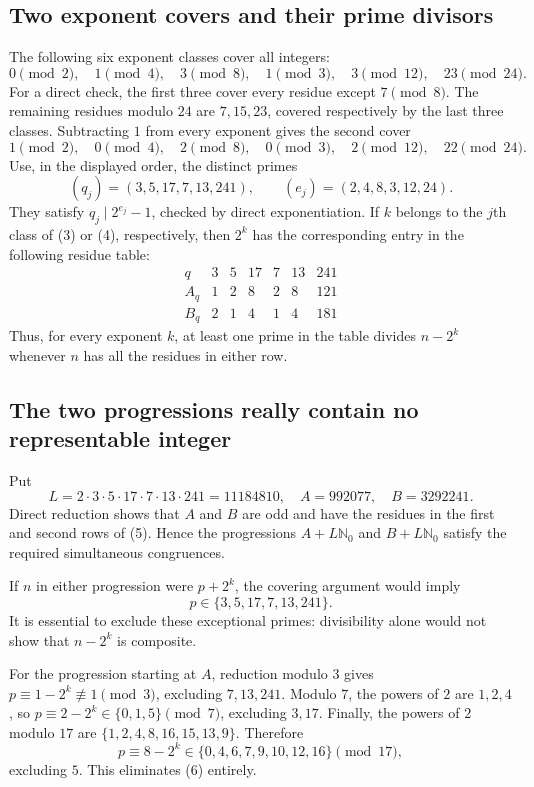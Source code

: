 \subsection{Two exponent covers and their prime divisors}
The following six exponent classes cover all integers:
\[
 0\pmod2,\quad1\pmod4,\quad3\pmod8,\quad
 1\pmod3,\quad3\pmod{12},\quad23\pmod{24}.
\tag{3}
\]
For a direct check, the first three cover every residue except $7\pmod8$. The remaining residues modulo $24$ are $7,15,23$, covered respectively by the last three classes. Subtracting $1$ from every exponent gives the second cover
\[
 1\pmod2,\quad0\pmod4,\quad2\pmod8,\quad
 0\pmod3,\quad2\pmod{12},\quad22\pmod{24}.
\tag{4}
\]
Use, in the displayed order, the distinct primes
\[
 (q_j)=(3,5,17,7,13,241),\qquad
 (e_j)=(2,4,8,3,12,24).
\]
They satisfy $q_j\mid2^{e_j}-1$, checked by direct exponentiation. If $k$ belongs to the $j$th class of (3) or (4), respectively, then $2^k$ has the corresponding entry in the following residue table:
\[
\begin{array}{c|rrrrrr}
 q&3&5&17&7&13&241\\ \hline
 A_q&1&2&8&2&8&121\\
 B_q&2&1&4&1&4&181
\end{array}
\tag{5}
\]
Thus, for every exponent $k$, at least one prime in the table divides $n-2^k$ whenever $n$ has all the residues in either row.

\subsection{The two progressions really contain no representable integer}
Put
\[
 L=2\cdot3\cdot5\cdot17\cdot7\cdot13\cdot241=11184810,
 \quad A=992077,\quad B=3292241.
\]
Direct reduction shows that $A$ and $B$ are odd and have the residues in the first and second rows of (5). Hence the progressions $A+L\mathbb N_0$ and $B+L\mathbb N_0$ satisfy the required simultaneous congruences.

If $n$ in either progression were $p+2^k$, the covering argument would imply
\[
 p\in\{3,5,17,7,13,241\}.
\tag{6}
\]
It is essential to exclude these exceptional primes: divisibility alone would not show that $n-2^k$ is composite.

For the progression starting at $A$, reduction modulo $3$ gives
$p\equiv1-2^k\not\equiv1\pmod3$, excluding $7,13,241$. Modulo $7$, the powers of $2$ are $1,2,4$, so
$p\equiv2-2^k\in\{0,1,5\}\pmod7$, excluding $3,17$. Finally, the powers of $2$ modulo $17$ are
$\{1,2,4,8,16,15,13,9\}$. Therefore
\[
 p\equiv8-2^k\in\{0,4,6,7,9,10,12,16\}\pmod{17},
\]
excluding $5$. This eliminates (6) entirely.


